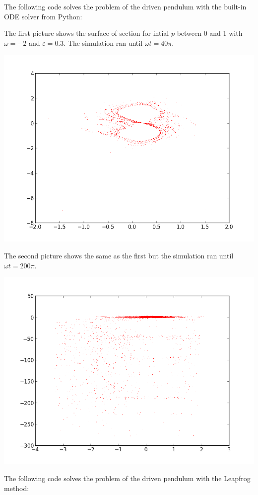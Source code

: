 \documentclass[%
]
{scrartcl}
\theoremstyle{plain}
\begin{document}
The following code solves the problem of the driven pendulum with the built-in ODE solver from Python:



The first picture shows the surface of section for intial $p$ between 0 and 1 with $\omega = -2$ and $\varepsilon = 0.3$. The simulation ran until $\omega t=40\pi$.

\begin{center}
\centering
\includegraphics[width=0.6\linewidth]{../drivenPendulumODEInt.png}
\end{center}

The second picture shows the same as the first but the simulation ran until $\omega t=200\pi$.

\begin{center}
\centering
\includegraphics[width=0.6\linewidth]{../drivenPendulumODEInt2.png}
\end{center}

The following code solves the problem of the driven pendulum with the Leapfrog method:
\end{document}
